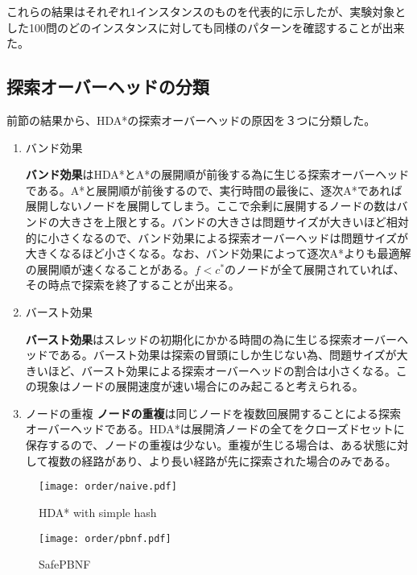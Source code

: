 \documentclass[uplatex]{jsarticle}
\begin{document}
これらの結果はそれぞれ1インスタンスのものを代表的に示したが、実験対象とした100問のどのインスタンスに対しても同様のパターンを確認することが出来た。


\subsection{探索オーバーヘッドの分類}

前節の結果から、HDA*の探索オーバーヘッドの原因を３つに分類した。
\begin{enumerate}
\item バンド効果
\vspace{3mm}

\textbf{バンド効果}はHDA*とA*の展開順が前後する為に生じる探索オーバーヘッドである。A*と展開順が前後するので、実行時間の最後に、逐次A*であれば展開しないノードを展開してしまう。ここで余剰に展開するノードの数はバンドの大きさを上限とする。バンドの大きさは問題サイズが大きいほど相対的に小さくなるので、バンド効果による探索オーバーヘッドは問題サイズが大きくなるほど小さくなる。なお、バンド効果によって逐次A*よりも最適解の展開順が速くなることがある。$f < c^*$のノードが全て展開されていれば、その時点で探索を終了することが出来る。
\newline

\item バースト効果
\vspace{3mm}

\textbf{バースト効果}はスレッドの初期化にかかる時間の為に生じる探索オーバーヘッドである。バースト効果は探索の冒頭にしか生じない為、問題サイズが大きいほど、バースト効果による探索オーバーヘッドの割合は小さくなる。この現象はノードの展開速度が速い場合にのみ起こると考えられる。
\newline

\item ノードの重複
\vspace{3mm}
\textbf{ノードの重複}は同じノードを複数回展開することによる探索オーバーヘッドである。HDA*は展開済ノードの全てをクローズドセットに保存するので、ノードの重複は少ない。重複が生じる場合は、ある状態に対して複数の経路があり、より長い経路が先に探索された場合のみである。


\end{enumerate}


\begin{figure}[h]
	\centering
	\begin{minipage}{0.45\columnwidth}
		\centering
		\texttt{[image: order/naive.pdf]}
		\caption{HDA* with simple hash}
		\label{fig:order_naive_hash}
	\end{minipage}
	\begin{minipage}{0.45\columnwidth}
		\centering
		\texttt{[image: order/pbnf.pdf]}
		\caption{SafePBNF}
		\label{fig:order_safepbnf}
	\end{minipage}
\end{figure}
\end{document}
